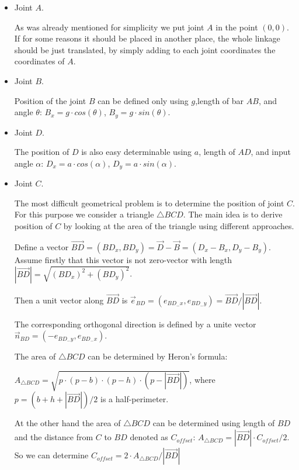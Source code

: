 \documentclass{article}
\begin{document}
 \begin{itemize}
 	\item Joint $A$.
 	
 	As was already mentioned for simplicity we put joint $A$ in the point $(0, 0)$. If for some reasons it should be placed in another place, the whole linkage should be just translated, by simply adding to each joint coordinates the coordinates of $A$.
 	
 	\item Joint $B$.
 	
 	Position of the joint $B$ can be defined only using $g$,length of bar $AB$, and angle $\theta$: $B_x = g \cdot cos(\theta)$, $B_y = g \cdot sin(\theta)$.
 	
 	\item Joint $D$.
 	
 	The position of $D$ is also easy determinable using $a$, length of $AD$, and input angle $\alpha$: $D_x = a \cdot cos(\alpha)$, $D_y = a \cdot sin(\alpha)$.
 	
 	\item Joint $C$.
 	
 	The most difficult geometrical problem is to determine the position of joint $C$. For this purpose we consider a triangle $\triangle BCD$. The main idea is to derive position of $C$ by looking at the area of the triangle using different approaches.
 	
 	Define a vector $\overrightarrow{BD} = (BD_x, BD_y) = \overrightarrow{D} - \overrightarrow{B} = (D_x - B_x, D_y - B_y)$. Assume firstly that this vector is not zero-vector with length $|\overrightarrow{BD}| = \sqrt{(BD_x)^2+(BD_y)^2}$. 
 	
 	Then a unit vector along $\overrightarrow{BD}$ is $\overrightarrow{e}_{BD} = (e_{BD_-x}, e_{BD_-y}) = \overrightarrow{BD} / |\overrightarrow{BD}|$.
 	
 	The corresponding orthogonal direction is defined by a unite vector $\overrightarrow{n}_{BD} = (-e_{BD_-y}, e_{BD_-x})$.
 	
 	The area of $\triangle BCD$ can be determined by Heron's formula:
 	
 	$A_{\triangle BCD} = \sqrt{p \cdot (p-b) \cdot (p-h) \cdot (p-|\overrightarrow{BD}|)}$, where $p = (b + h + |\overrightarrow{BD}|)/2$ is a half-perimeter.
 	
 	At the other hand the area of $\triangle BCD$ can be determined using length of $BD$ and the distance from $C$ to $BD$ denoted as $C_{offset}$: $A_{\triangle BCD} = |\overrightarrow{BD}| \cdot C_{offset} / 2$. So we can determine $C_{offset} = 2 \cdot A_{\triangle BCD}/ |\overrightarrow{BD}|$
 	

\end{itemize}
\end{document}
